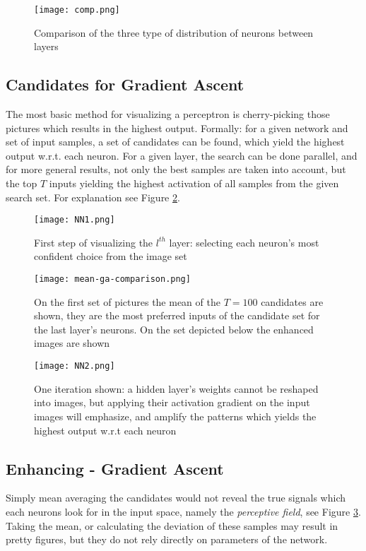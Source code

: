 \begin{figure}
    \centering
    \texttt{[image: comp.png]}
    \caption{Comparison of the three type of distribution of neurons between layers}
    \label{fig:comp}
\end{figure}


\subsection{Candidates for Gradient Ascent}
\label{method}
The most basic method for visualizing a perceptron is cherry-picking those pictures which results in the highest output.
Formally: for a given network and set of input samples, a set of candidates can be found, which yield the highest output w.r.t. each neuron. 
For a given layer, the search can be done parallel, and for more general results, not only the best samples are taken into account, but the top $T$ inputs yielding the highest activation of all samples from the given search set. For explanation see Figure \ref{fig:ga-method1}. 
\begin{figure}
    \centering
    \texttt{[image: NN1.png]}
    \caption{First step of visualizing the $l^{th}$ layer: selecting each neuron's most confident choice from the image set}
    \label{fig:ga-method1}
\end{figure}
\begin{figure}
    \centering
    \texttt{[image: mean-ga-comparison.png]}
    \caption{On the first set of pictures the mean of the $T=100$ candidates are shown, they are the most preferred inputs of the candidate set for the last layer's neurons. On the set depicted below the enhanced images are shown}
    \label{fig:mean-ga-comp}
\end{figure}
\begin{figure}
    \centering
    \texttt{[image: NN2.png]}
    \caption{One iteration shown: a hidden layer's weights cannot be reshaped into images, but applying their activation gradient on the input images will emphasize, and amplify the patterns which yields the highest output w.r.t each neuron}
    \label{fig:ga-method2}
\end{figure}

\subsection{Enhancing - Gradient Ascent}

Simply mean averaging the candidates would not reveal the true signals which each neurons look for in the input space, namely the \emph{perceptive field}, see Figure \ref{fig:mean-ga-comp}.
Taking the mean, or calculating the deviation of these samples may result in pretty figures, but they do not rely directly on parameters of the network.


